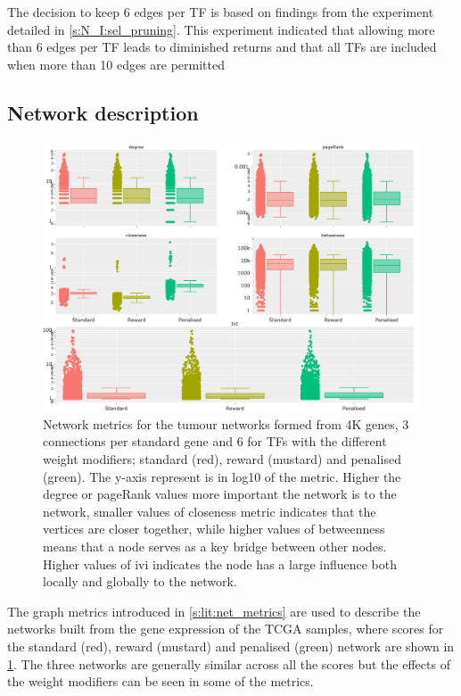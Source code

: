 The decision to keep 6 edges per TF is based on findings from the experiment detailed in \cref{s:N_I:sel_pruning}. This experiment indicated that allowing more than 6 edges per TF leads to diminished returns and that all TFs are included when more than 10 edges are permitted

\subsection{Network description} \label{s:N_I:tum_describe}

\begin{figure}[!t]  
\centering
\includegraphics[width=1.0\textwidth,keepaspectratio]{Sections/Network_I/Resources/Tum_network/NetworkMetricsComp_6TF.png}
    \caption{Network metrics for the tumour networks formed from 4K genes, 3 connections per standard gene and 6 for TFs with the different weight modifiers; standard (red), reward (mustard) and penalised (green). The y-axis represent is in log10 of the metric. Higher the degree or pageRank values more important the network is to the network, smaller values of closeness metric indicates that the vertices are closer together, while higher values of betweenness means that a node serves as a key bridge between other nodes. Higher values of \acrfull{ivi} indicates the node has a large influence both locally and globally to the network.}
    \label{fig:N_I:net_metrics_tum}
\end{figure}

The graph metrics introduced in \cref{s:lit:net_metrics} are used to describe the networks built from the gene expression of the TCGA samples, where scores for the standard (red), reward (mustard) and penalised (green) network are shown in \cref{fig:N_I:net_metrics_tum}. The three networks are generally similar across all the scores but the effects of the weight modifiers can be seen in some of the metrics. 

